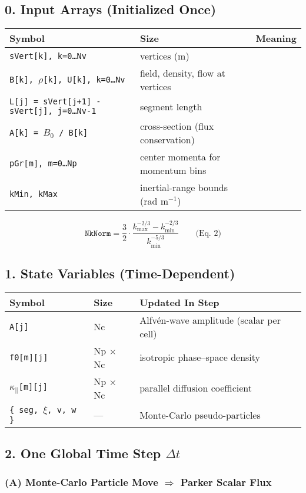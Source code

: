 \subsection*{0. Input Arrays (Initialized Once)}

\begin{tabular}{|l|l|l|}
\hline
\textbf{Symbol} & \textbf{Size} & \textbf{Meaning} \\
\hline
\texttt{sVert[k], k=0\dots Nv} & vertices (m) & \\
\texttt{B[k], $\rho$[k], U[k], k=0\dots Nv} & field, density, flow at vertices & \\
\texttt{L[j] = sVert[j+1] - sVert[j], j=0\dots Nv-1} & segment length & \\
\texttt{A[k] = $B_0$ / B[k]} & cross-section (flux conservation) & \\
\texttt{pGr[m], m=0\dots Np} & center momenta for momentum bins & \\
\texttt{kMin, kMax} & inertial-range bounds (rad m$^{-1}$) & \\
\hline
\end{tabular}

\[
\texttt{NkNorm} = \frac{3}{2} \cdot \frac{k_{\text{max}}^{-2/3} - k_{\text{min}}^{-2/3}}{k_{\text{min}}^{-5/3}} \qquad \text{(Eq. 2)}
\]

\subsection*{1. State Variables (Time-Dependent)}

\begin{tabular}{|l|l|l|}
\hline
\textbf{Symbol} & \textbf{Size} & \textbf{Updated In Step} \\
\hline
\texttt{A[j]} & Nc & Alfvén-wave amplitude (scalar per cell) \\
\texttt{f0[m][j]} & Np $\times$ Nc & isotropic phase–space density \\
\texttt{$\kappa_\parallel$[m][j]} & Np $\times$ Nc & parallel diffusion coefficient \\
\texttt{\{ seg, $\xi$, v, w \}} & — & Monte-Carlo pseudo-particles \\
\hline
\end{tabular}

\subsection*{2. One Global Time Step $\Delta t$}

\subsubsection*{(A) Monte-Carlo Particle Move $\Rightarrow$ Parker Scalar Flux}

